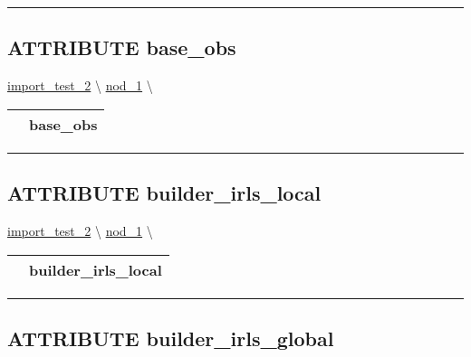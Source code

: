 \par


\rule{\linewidth}{0.5pt}
\subsection*{\textsf{\colorbox{headtoc}{\color{white} ATTRIBUTE}
base\_obs}}

\hypertarget{ecldoc:constants.base_obs}{}
\hspace{0pt} \hyperlink{ecldoc:import_test_2}{import_test_2} \textbackslash 
\hspace{0pt} \hyperlink{ecldoc:Constants}{nod_1} \textbackslash 

{\renewcommand{\arraystretch}{1.5}
\begin{tabularx}{\textwidth}{|>{\raggedright\arraybackslash}l|X|}
\hline
\hspace{0pt}\mytexttt{\color{red} } & \textbf{base\_obs} \\
\hline
\end{tabularx}
}

\par


\rule{\linewidth}{0.5pt}
\subsection*{\textsf{\colorbox{headtoc}{\color{white} ATTRIBUTE}
builder\_irls\_local}}

\hypertarget{ecldoc:constants.builder_irls_local}{}
\hspace{0pt} \hyperlink{ecldoc:import_test_2}{import_test_2} \textbackslash 
\hspace{0pt} \hyperlink{ecldoc:Constants}{nod_1} \textbackslash 

{\renewcommand{\arraystretch}{1.5}
\begin{tabularx}{\textwidth}{|>{\raggedright\arraybackslash}l|X|}
\hline
\hspace{0pt}\mytexttt{\color{red} } & \textbf{builder\_irls\_local} \\
\hline
\end{tabularx}
}

\par


\rule{\linewidth}{0.5pt}
\subsection*{\textsf{\colorbox{headtoc}{\color{white} ATTRIBUTE}
builder\_irls\_global}}

